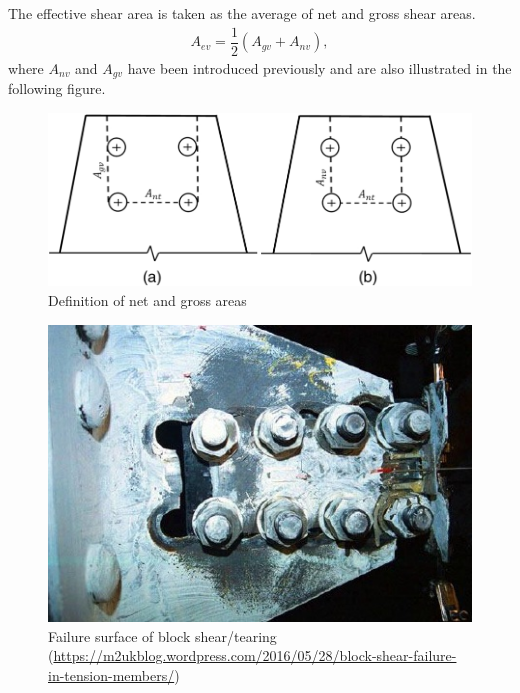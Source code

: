 The effective shear area is taken as the average of net and gross shear areas.
\begin{gather}
A_{ev}=\dfrac{1}{2}\left(A_{gv}+A_{nv}\right),
\end{gather}
where $A_{nv}$ and $A_{gv}$ have been introduced previously and are also illustrated in the following figure.
\begin{figure}[H]
\centering\footnotesize
\includegraphics[width=12cm]{PIC/CH06/TB}
\caption{Definition of net and gross areas}
\end{figure}
\begin{figure}[H]
\centering\footnotesize
\includegraphics[scale=.8]{PIC/CH06/BTOF}
\caption{Failure surface of block shear/tearing (\href{https://m2ukblog.wordpress.com/2016/05/28/block-shear-failure-in-tension-members/}{\url{https://m2ukblog.wordpress.com/2016/05/28/block-shear-failure-in-tension-members/}})}
\end{figure}
